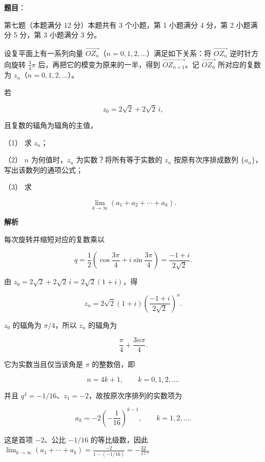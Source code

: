 \begin{answer}

\textbf{题目}：

第七题（本题满分 12 分）本题共有 3 个小题，第 1 小题满分 4 分，第 2 小题满分 5 分，第 3 小题满分 3 分。

设复平面上有一系列向量 $\overrightarrow{OZ_n}$（$n=0,1,2,\ldots$）满足如下关系：将 $\overrightarrow{OZ_n}$ 逆时针方向旋转 $\frac34\pi$ 后，再把它的模变为原来的一半，得到 $\overrightarrow{OZ_{n+1}}$。记 $\overrightarrow{OZ_n}$ 所对应的复数为 $z_n$（$n=0,1,2,\ldots$）。

若

\nopagebreak[4]
\[
z_0=2\sqrt2+2\sqrt2\,i,
\]

且复数的辐角为辐角的主值，

（1） 求 $z_n$；

（2） $n$ 为何值时，$z_n$ 为实数？将所有等于实数的 $z_n$ 按原有次序排成数列 $\{a_n\}$，写出该数列的通项公式；

（3） 求

\nopagebreak[4]
\[
\lim_{k\to\infty}(a_1+a_2+\cdots+a_k).
\]

\textbf{解析}

每次旋转并缩短对应的复数乘以

\nopagebreak[4]
\[
q=\frac12\left(\cos\frac{3\pi}{4}
+i\sin\frac{3\pi}{4}\right)
=\frac{-1+i}{2\sqrt2}.
\]


由 $z_0=2\sqrt2+2\sqrt2\,i=2\sqrt2(1+i)$，得

\nopagebreak[4]
\[
z_n=2\sqrt2(1+i)
\left(\frac{-1+i}{2\sqrt2}\right)^n.
\]


$z_0$ 的辐角为 $\pi/4$，所以 $z_n$ 的辐角为

\nopagebreak[4]
\[
\frac\pi4+\frac{3n\pi}{4}.
\]

它为实数当且仅当该角是 $\pi$ 的整数倍，即

\nopagebreak[4]
\[
n=4k+1,\qquad k=0,1,2,\ldots.
\]

并且 $q^4=-1/16$、$z_1=-2$，故按原次序排列的实数项为

\nopagebreak[4]
\[
a_k=-2\left(-\frac1{16}\right)^{k-1},
\qquad k=1,2,\ldots.
\]


这是首项 $-2$、公比 $-1/16$ 的等比级数，因此
$\lim_{k\to\infty}(a_1+\cdots+a_k)=\frac{-2}{1-(-1/16)}=-\frac{32}{17}$。




\end{answer}